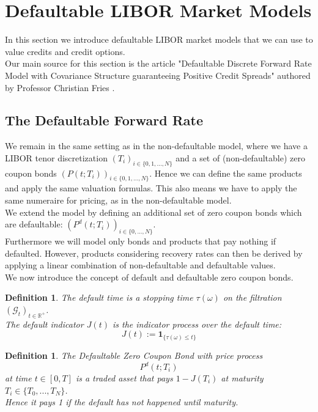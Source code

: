 \documentclass[12pt]{article}
\newtheorem{definition}[theorem]{Definition}
\begin{document}
	
	
	
	
	\pagebreak
	\section{Defaultable LIBOR Market Models}\label{sec:defaultableLMM}
	
	In this section we introduce defaultable LIBOR market models that we can use to value credits and credit options.\\
	Our main source for this section is the article "Defaultable Discrete Forward Rate Model with Covariance Structure guaranteeing Positive Credit Spreads" authored by Professor Christian Fries \cite{FriesDLMM}.\\

	\subsection{The Defaultable Forward Rate}
		We remain in the same setting as in the non-defaultable model, where we have a LIBOR tenor discretization \((T_i)_{i\in\{0, 1, ..., N\}}\) and a set of (non-defaultable) zero coupon bonds \((P(t;T_i))_{i\in\{0, 1, ..., N\}}\). Hence we can define the same products and apply the same valuation formulas. This also means we have to apply the same numeraire for pricing, as in the non-defaultable model.\\
		We extend the model by defining an additional set of zero coupon bonds which are defaultable: \((P^d(t;T_i))_{i\in\{0, ..., N\}}\).\\
		Furthermore we will model only bonds and products that pay nothing if defaulted. However, products considering recovery rates can then be derived by applying a linear combination of non-defaultable and defaultable values.\\
		We now introduce the concept of default and defaultable zero coupon bonds.
	\begin{definition}
		The \emph{default time} is a stopping time \(\tau(\omega)\) on the filtration \((\mathcal{G}_t)_{t\in \mathbb{R}^+}\).\\
		The \emph{default indicator} \(J(t)\) is the indicator process over the default time:
		\[J(t) := \mathbf{1}_{\{\tau(\omega) \le t\}}\]
	\end{definition}
	\begin{definition}
		The \emph{Defaultable Zero Coupon Bond} with price process \[P^d(t; T_i)\] at time \(t \in \left[0, T\right]\) is a traded asset that pays \(1 - J(T_i)\) at maturity  \(T_i \in \{T_0, ..., T_N\}\).\\
		Hence it pays 1 if the default has not happened until maturity. 
	\end{definition}
\end{document}
